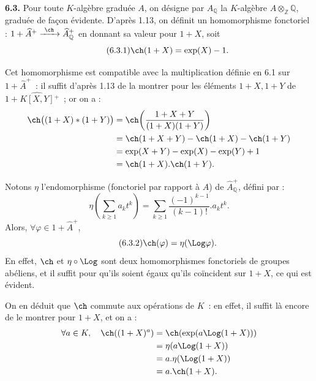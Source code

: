 \textbf{6.3.}
Pour toute \(K\)-algèbre graduée \(A\), on désigne par \(A_{\mathbb Q}\) la \(K\)-algèbre \(A\otimes_{\mathbb Z}\mathbb Q\), graduée de façon évidente. D'après 1.13, on définit un homomorphisme fonctoriel : \(1+\widehat A^+\xrightarrow{\ \ch\ }\widehat A_{\mathbb Q}^{+}\) en donnant sa valeur pour \(1+X\), soit
\begin{equation}\tag{6.3.1}
  \ch(1+X)=\exp(X)-1.
\end{equation}

Cet homomorphisme est compatible avec la multiplication définie en 6.1 sur \(1+\widehat A^+\)~: il suffit d'après 1.13 de la montrer pour les éléments \(1+X,1+Y\) de \(1+\widehat{K[X,Y]}{}^{+}\)~; or on a :
\[
\begin{aligned}
 \ch\bigl((1+X)*(1+Y)\bigr)
 &= \ch\!\left(\frac{1+X+Y}{(1+X)(1+Y)}\right)\\
 &= \ch(1+X+Y)-\ch(1+X)-\ch(1+Y)\\
 &= \exp(X+Y)-\exp(X)-\exp(Y)+1\\
 &= \ch(1+X).\ch(1+Y).
\end{aligned}
\]

Notons \(\eta\) l'endomorphisme (fonctoriel par rapport à \(A\)) de \(\widehat A_{\mathbb Q}^{+}\), défini par :
\[
 \eta\!\left(\sum_{k\ge1} a_k t^k\right)
 =
 \sum_{k\ge1}\frac{(-1)^{k-1}}{(k-1)!}.a_k t^k.
\]
Alors, \(\forall\varphi\in1+\widehat A^+\),
\begin{equation}\tag{6.3.2}
  \ch(\varphi)=\eta(\Log\varphi).
\end{equation}
En effet, \(\ch\) et \(\eta\circ\Log\) sont deux homomorphismes fonctoriels de groupes abéliens, et il suffit pour qu'ils soient égaux qu'ils coïncident sur \(1+X\), ce qui est évident.

On en déduit que \(\ch\) commute aux opérations de \(K\)~: en effet, il suffit là encore de le montrer pour \(1+X\), et on a :
\[
\begin{aligned}
 \forall a\in K,\quad\ch((1+X)^a)
 &=\ch(\exp(a\Log(1+X)))\\
 &=\eta(a\Log(1+X))\\
 &=a.\eta(\Log(1+X))\\
 &=a.\ch(1+X).
\end{aligned}
\]
